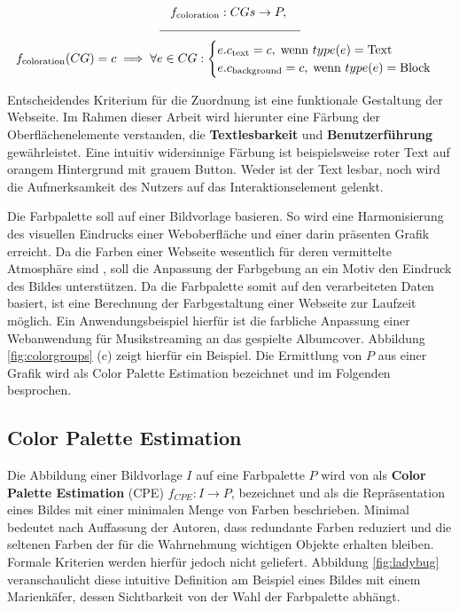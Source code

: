 \documentclass[11pt, bibliography=totoc]{scrartcl}
\begin{document}
\begin{equation}
\begin{gathered}
  f_\text{coloration}: CGs \to P,\; \\[-1mm] 
  \mathclap{\rule{4cm}{0.4pt}}\\
  f_\text{coloration}(CG) = c \implies \forall e \in CG:
  	\begin{cases}
		e.c_\text{text} = c, \; \text{wenn } type(e) = \text{Text} \\
		e.c_\text{background} = c, \; \text{wenn } type(e) = \text{Block}
	\end{cases}
\end{gathered}
\end{equation}

Entscheidendes Kriterium für die Zuordnung  ist eine funktionale Gestaltung der Webseite. Im Rahmen dieser Arbeit wird hierunter eine Färbung der Oberflächenelemente verstanden, die \textbf{Textlesbarkeit} und \textbf{Benutzerführung} gewährleistet. Eine intuitiv widersinnige Färbung ist beispielsweise roter Text auf orangem Hintergrund mit grauem Button. Weder ist der Text lesbar, noch wird die Aufmerksamkeit des Nutzers auf das Interaktionselement gelenkt.

Die Farbpalette soll auf einer Bildvorlage basieren. So wird eine Harmonisierung des visuellen Eindrucks einer Weboberfläche und einer darin präsenten Grafik erreicht. Da die Farben einer Webseite wesentlich für deren vermittelte Atmosphäre sind \citep{webdesign}, soll die Anpassung der Farbgebung an ein Motiv den Eindruck des Bildes unterstützen. Da die Farbpalette somit auf den verarbeiteten Daten basiert, ist eine Berechnung der Farbgestaltung einer Webseite zur Laufzeit möglich. Ein Anwendungsbeispiel hierfür ist die farbliche Anpassung einer Webanwendung für Musikstreaming an das gespielte Albumcover. Abbildung \ref{fig:colorgroups} (c) zeigt hierfür ein Beispiel. Die Ermittlung von $P$ aus einer Grafik wird als Color Palette Estimation bezeichnet und im Folgenden besprochen.

\subsection{Color Palette Estimation}
\label{sec:cpe}

Die Abbildung einer Bildvorlage $I$ auf eine Farbpalette $P$ wird von \citet{acopa} als \textbf{Color Palette Estimation} (CPE) $f_{CPE}: I \to P$, bezeichnet und als die Repräsentation eines Bildes mit einer minimalen Menge von Farben beschrieben. \glqq{}Minimal\grqq{} bedeutet nach Auffassung der Autoren, dass redundante Farben reduziert und die seltenen Farben der für die Wahrnehmung wichtigen Objekte erhalten bleiben. Formale Kriterien werden hierfür jedoch nicht geliefert. Abbildung \ref{fig:ladybug} veranschaulicht diese intuitive Definition am Beispiel eines Bildes mit einem Marienkäfer, dessen Sichtbarkeit von der Wahl der Farbpalette abhängt.
\end{document}
